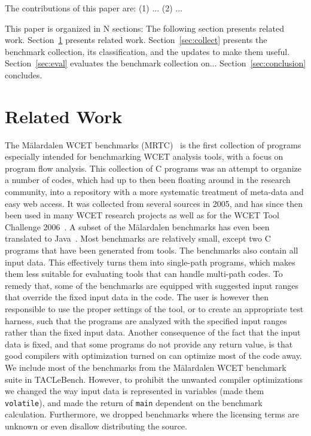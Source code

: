\documentclass[a4paper,UKenglish]{oasics}
\newcommand{\code}[1]{{\small{\texttt{#1}}}}
\begin{document}
The contributions of this paper are: (1) ... (2) ...

This paper is organized in N sections: The following section presents related work.
Section~\ref{sec:related} presents related work.
Section~\ref{sec:collect} presents the benchmark collection, its classification, and the updates
to make them useful.
Section~\ref{sec:eval} evaluates the benchmark collection on...
Section~\ref{sec:conclusion} concludes.

\section{Related Work}
\label{sec:related}

The M{\"a}lardalen WCET benchmarks (MRTC)~\cite{wcet:bench:2012} is the first collection of programs especially
intended for benchmarking WCET analysis tools, with a focus on program flow analysis.
This collection of C programs was an attempt to organize a number of codes, which had up to then been floating around
in the research community, into a repository with a more systematic treatment of meta-data and easy web access.
It was collected from several sources in 2005, and has since then been
used in many WCET research projects as well as for the WCET Tool Challenge 2006~\cite{Gustafsson:ISOLA2006}.
A subset of the M{\"a}lardalen benchmarks has even been translated to
Java~\cite{jop:volta:rtas2008}. Most benchmarks are relatively small, except
two C programs that have been generated from tools. The benchmarks also
contain all input data. This effectively turns them into single-path programs, which
makes them less suitable for evaluating tools that can handle multi-path codes. To remedy that,
some of the benchmarks are equipped with suggested input ranges that override the fixed
input data in the code. The user is however then responsible to use the proper settings of the tool,
or to create an appropriate test harness, such that the programs are analyzed with the specified input ranges
rather than the fixed input data. Another consequence of the fact that the
input data is fixed, and that some programs do not provide
any return value, is that good compilers with optimization turned on can optimize
most of the code away. We include most of the benchmarks from the
 M{\"a}lardalen WCET benchmark suite in TACLeBench.
 However, to prohibit the unwanted compiler optimizations we changed
 the way input data is represented in variables (made them \code{volatile}),
 and made the return of \code{main} dependent on the benchmark calculation.
 Furthermore, we dropped benchmarks where the licensing terms are unknown
 or even disallow distributing the source.
\end{document}
